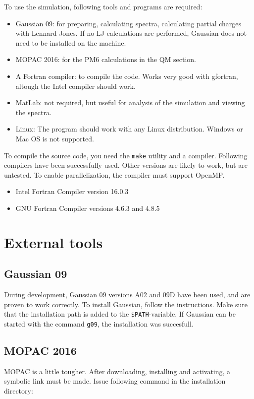 To use the simulation, following tools and programs are required:
\begin{itemize}
	\item Gaussian 09: for preparing, calculating spectra, calculating partial 
	charges with Lennard-Jones. If no LJ calculations are performed, Gaussian 
	does not need to be installed on the machine.
	\item MOPAC 2016: for the PM6 calculations in the QM section.
	\item A Fortran compiler: to compile the code. Works very good with 
	gfortran, altough the Intel compiler should work.
	\item MatLab: not required, but useful for analysis of the simulation and 
	viewing the spectra.
	\item Linux: The program should work with any Linux distribution. Windows 
	or Mac OS is not supported.
\end{itemize}

To compile the source code, you need the \verb|make| utility and a compiler. 
Following compilers have been successfully used. Other versions are likely to 
work, but are untested. To enable parallelization, the compiler must support 
OpenMP.
\begin{itemize}
	\item Intel Fortran Compiler version 16.0.3
	\item GNU Fortran Compiler versions 4.6.3 and 4.8.5
\end{itemize}

\section{External tools}
\subsection{Gaussian 09}
During development, Gaussian 09\cite{g09} versions A02 and 09D have been used, 
and are proven to work correctly.
To install Gaussian, follow the instructions. Make sure that the installation 
path is added to the \verb|$PATH|-variable. If Gaussian can be started with the 
command \verb|g09|, the installation was succesfull.

\subsection{MOPAC 2016}
MOPAC\cite{mopac} is a little tougher. After downloading, installing and 
activating, a 
symbolic link must be made. Issue following command in the installation 
directory:

